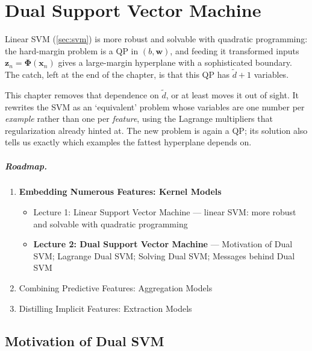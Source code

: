 \chapter{Dual Support Vector Machine}

\begin{prev}
    Linear SVM (\autoref{sec:svm}) is more robust and solvable with quadratic
    programming: the hard-margin problem is a QP in \((b, \bm{w})\), and
    feeding it transformed inputs \(\bm{z}_n = \bm{\Phi}(\bm{x}_n)\) gives a
    large-margin hyperplane with a sophisticated boundary. The catch, left
    at the end of the chapter, is that this QP has \(\tilde{d} + 1\)
    variables.
\end{prev}

This chapter removes that dependence on \(\tilde{d}\), or at least moves it
out of sight. It rewrites the SVM as an `equivalent' problem whose variables
are one number per \emph{example} rather than one per \emph{feature}, using
the Lagrange multipliers that regularization already hinted at. The new
problem is again a QP; its solution also tells us exactly which examples
the fattest hyperplane depends on.

\paragraph{Roadmap.}
\begin{enumerate}
    \item \textbf{Embedding Numerous Features: Kernel Models}
        \begin{itemize}
            \item[] Lecture 1: Linear Support Vector Machine --- linear SVM:
                more robust and solvable with quadratic programming
            \item[] \textbf{Lecture 2: Dual Support Vector Machine} ---
                Motivation of Dual SVM; Lagrange Dual SVM; Solving Dual SVM;
                Messages behind Dual SVM
        \end{itemize}
    \item Combining Predictive Features: Aggregation Models
    \item Distilling Implicit Features: Extraction Models
\end{enumerate}

\section{Motivation of Dual SVM}\label{sec:dual-motivation}

